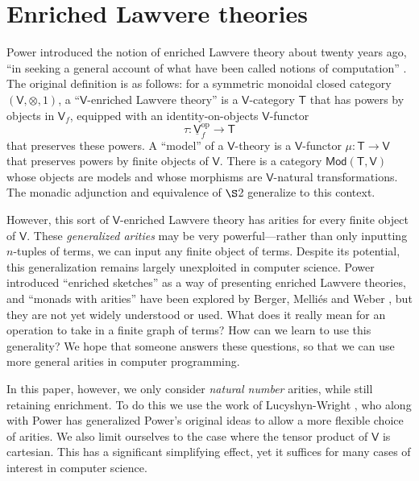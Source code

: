 \documentclass{amsart}
\theoremstyle{definition}
\newcommand{\Mod}{\mathsf{Mod}}
\newcommand{\V}{\mathsf{V}}
\newcommand{\T}{\mathsf{T}}
\newcommand{\op}{\mathrm{op}}
\newcommand{\maps}{\colon}
\begin{document}
\section{Enriched Lawvere theories}
\label{sec:enriched_lawvere}

Power introduced the notion of enriched Lawvere theory about twenty years ago, ``in seeking a general account of what have been called notions of computation'' \cite{power}. The original definition is as follows: for a symmetric monoidal closed category $(\V,\otimes,1)$, a ``$\V$-enriched Lawvere theory'' is a $\V$-category $\T$ that has powers by objects in $\V_f$, equipped with an identity-on-objects $\V$-functor 
\[  \tau\maps \underline{\V}_f^\op \to \T \]
that preserves these powers.  A ``model'' of a $\V$-theory is a $\V$-functor $\mu\maps\T \to \V$ that preserves powers by finite objects of $\V$.  There is a category $\Mod(\T,\V)$ whose objects are models and whose morphisms are $\V$-natural transformations. The monadic adjunction and equivalence of $\S$2 generalize to this context.

However, this sort of $\V$-enriched Lawvere theory has arities for every finite object of $\V$.  These \textit{generalized arities} may be very powerful---rather than only inputting $n$-tuples of terms, we can input any finite object of terms.  Despite its potential, this generalization remains largely unexploited in computer science.   Power \cite{powsketch} introduced ``enriched sketches'' as a way of presenting enriched Lawvere theories, and ``monads with arities'' have been explored by Berger, Melli\'es and Weber \cite{bergermelliesweber}, but they are not yet widely understood or used.  What does it really mean for an operation to take in a finite graph of terms?  How can we learn to use this generality?  We hope that someone answers these questions, so that we can use more general arities in computer programming.

In this paper, however, we only consider \textit{natural number} arities, while still retaining enrichment. To do this we use the work of Lucyshyn-Wright \cite{lucyshyn-wright}, who along with Power \cite{np} has generalized Power's original ideas to allow a more flexible choice of arities.    We also limit ourselves to the case where the tensor product of $\V$ is cartesian.  This has a significant simplifying effect, yet it suffices for many cases of interest in computer science.
\end{document}
